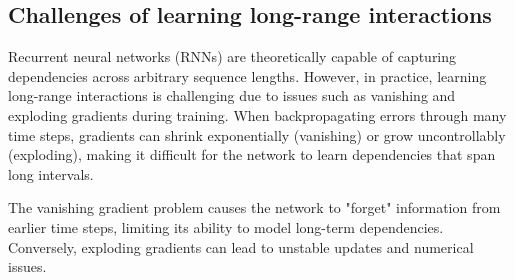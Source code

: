 \subsection{Challenges of learning long-range interactions}
Recurrent neural networks (RNNs) are theoretically capable of capturing dependencies across arbitrary sequence lengths. However, in practice, learning long-range interactions is challenging due to issues such as vanishing and exploding gradients during training. When backpropagating errors through many time steps, gradients can shrink exponentially (vanishing) or grow uncontrollably (exploding), making it difficult for the network to learn dependencies that span long intervals.

The vanishing gradient problem causes the network to "forget" information from earlier time steps, limiting its ability to model long-term dependencies. Conversely, exploding gradients can lead to unstable updates and numerical issues. 


